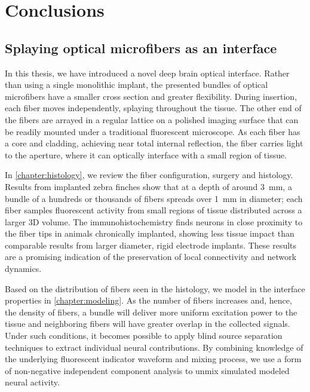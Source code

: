 \chapter{Conclusions}
\label{chapter:Conclusions}

\thispagestyle{myheadings}

\graphicspath{{7_Conclusion/Figures/}}


\section{Splaying optical microfibers as an interface}

In this thesis, we have introduced a novel deep brain 
optical interface. Rather than using a single monolithic 
implant, the presented bundles of optical microfibers 
have a smaller cross section and greater flexibility. 
During insertion, each fiber moves independently, 
splaying throughout the tissue. The other end of the 
fibers are arrayed in a regular lattice on a polished 
imaging surface that can be readily mounted under a 
traditional fluorescent microscope. As each fiber has a 
core and cladding, achieving near total internal 
reflection, the fiber carries light to the aperture, 
where it can optically interface with a small region 
of tissue.

In \cref{chapter:histology}, we review the fiber 
configuration, surgery and histology. Results from 
implanted zebra finches show that at a depth of around 
3~mm, a bundle of a hundreds or thousands of fibers 
spreads over 1~mm in diameter; each fiber samples 
fluorescent activity from small regions of tissue 
distributed across a larger 3D volume. The 
immunohistochemistry finds neurons in close proximity 
to the fiber tips in animals chronically implanted, 
showing less tissue impact than comparable results 
from larger diameter, rigid electrode implants. 
These results are a promising indication of the 
preservation of local connectivity and network 
dynamics.

Based on the distribution of fibers seen in the 
histology, we model in the interface properties 
in \cref{chapter:modeling}. As the number of fibers 
increases and, hence, the density of fibers, a 
bundle will deliver more uniform excitation power 
to the tissue and neighboring fibers will have 
greater overlap in the collected signals. Under 
such conditions, it becomes possible to apply 
blind source separation techniques to extract 
individual neural contributions. By combining 
knowledge of the underlying fluorescent indicator 
waveform and mixing process, we use a form of 
non-negative independent component analysis to 
unmix simulated modeled neural activity.

